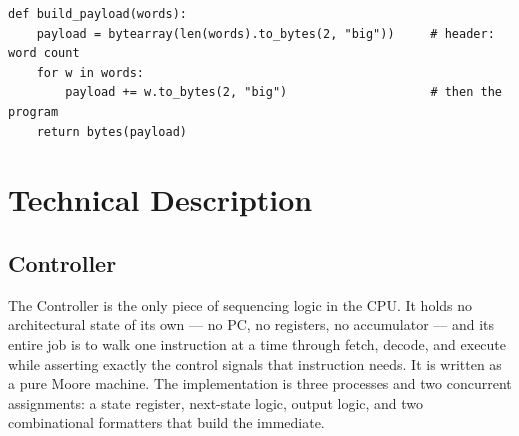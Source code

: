 \documentclass[11pt,letterpaper]{article}
\begin{document}
\begin{lstlisting}[style=py,caption={The framing step from \texttt{uploader.py}.}]
def build_payload(words):
    payload = bytearray(len(words).to_bytes(2, "big"))     # header: word count
    for w in words:
        payload += w.to_bytes(2, "big")                    # then the program
    return bytes(payload)
\end{lstlisting}


\section{Technical Description}

\subsection{Controller}
The Controller is the only piece of sequencing logic in the CPU. It holds no
architectural state of its own --- no PC, no registers, no accumulator --- and
its entire job is to walk one instruction at a time through fetch, decode, and
execute while asserting exactly the control signals that instruction needs. It
is written as a pure Moore machine.
The implementation is three processes and two concurrent assignments: a state
register, next-state logic, output logic, and two combinational formatters that
build the immediate.
\end{document}
